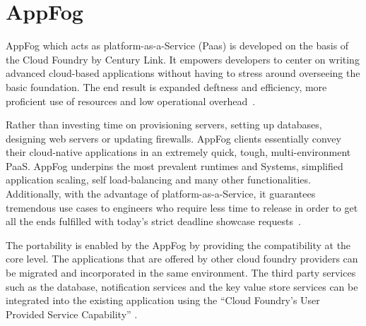 \section{AppFog}

AppFog which acts as platform-as-a-Service (Paas) is developed on the
basis of the Cloud Foundry by Century Link. It empowers developers to
center on writing advanced cloud-based applications without having to
stress around overseeing the basic foundation. The end result is
expanded deftness and efficiency, more proficient use of resources and
low operational overhead~\cite{hid-sp18-412-century_link_appfog}.

Rather than investing time on provisioning servers, setting up
databases, designing web servers or updating firewalls. AppFog clients
essentially convey their cloud-native applications in an extremely
quick, tough, multi-environment PaaS. AppFog underpins the most
prevalent runtimes and Systems, simplified application scaling, self
load-balancing and many other functionalities. Additionally, with the
advantage of platform-as-a-Service, it guarantees tremendous use cases
to engineers who require less time to release in order to get all the
ends fulfilled with today's strict deadline showcase
requests~\cite{hid-sp18-412-century_link_appfog}.

The portability is enabled by the AppFog by providing the
compatibility at the core level. The applications that are offered by
other cloud foundry providers can be migrated and incorporated in the
same environment.  The third party services such as the database,
notification services and the key value store services can be
integrated into the existing application using the “Cloud Foundry's
User Provided Service Capability”
\cite{hid-sp18-412-century_link_appfog}.

